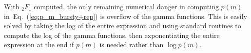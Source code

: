 \documentclass[12pt]{article}%
\newcommand{\eq}[1]{Eq.~(\ref{#1})}
\begin{document}
With ${_2F_1}$ computed, the only remaining numerical danger in computing
$p(m)$ in~\eq{eq:p_m_bursty+rep} is overflow of the gamma functions.
This is easily solved by taking the log of the entire expression
and using standard routines to compute the log of the gamma functions,
then exponentiating the entire expression at the end if $p(m)$
is needed rather than $\log p(m)$.


% 


\end{document}
